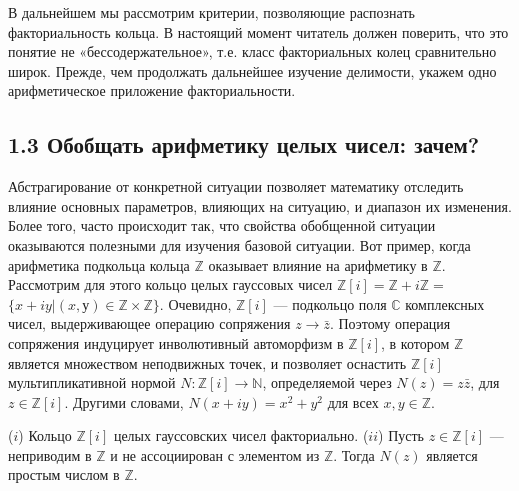 В дальнейшем мы рассмотрим критерии, позволяющие распознать факториальность кольца. В настоящий момент читатель должен пове­рить, что это понятие не «бессодержательное», т.е. класс факториаль­ных колец сравнительно широк. Прежде, чем продолжать дальнейшее изучение делимости, укажем одно арифметическое приложение факториальности.

\newpage

\subsection{\large 1.3 Обобщать арифметику целых чисел: зачем?}

\noindent Абстрагирование от конкретной ситуации позволяет математику отследить влияние основных параметров, влияющих на ситуацию, и диапазон их изменения. Более того, часто происходит так, что свойства обобщенной ситуации оказываются полезными для изучения базовой ситуации. Вот пример, когда арифметика подкольца кольца $\mathds{Z}$ оказывает влияние на арифметику в $\mathds{Z}$.
\newline \indent Рассмотрим для этого кольцо целых гауссовых чисел $\mathds{Z}[i] = \mathds{Z} + i\mathds{Z} =$\newline $\{x + iy | (x, у) \in \mathds{Z} \times \mathds{Z}\}$. Очевидно, $\mathds{Z}[i]$ — подкольцо поля $\mathds{C}$ комплексных чисел, выдерживающее операцию сопряжения $z \rightarrow \bar{z}$. Поэтому операция сопряжения индуцирует инволютивный автоморфизм в $\mathds{Z}[i]$, в котором $\mathds{Z}$ является множеством неподвижных точек, и позволяет оснастить $\mathds{Z}[i]$ мультипликативной нормой $N : \mathds{Z}[i] \rightarrow \mathds{N}$, определяемой через $N(z) = z\bar{z}$, для $z \in \mathds{Z}[i]$. Другими словами, $N(x + iy) = x^2 + y^2 $ для всех $x , y \in \mathds{Z}$.

\begin{predl}
\textit{\indent} ($i$) Кольцо $\mathds{Z}[i]$ целых гауссовских чисел факториально. 
\newline \indent($ii$)  Пусть $z \in \mathds{Z}[i]$ — неприводим в $\mathds{Z}$ и не ассоциирован с элементом из $\mathds{Z}$. Тогда $N(z)$ является простым числом в $\mathds{Z}$.
\end{predl}

